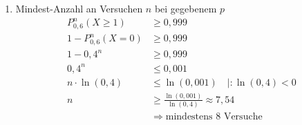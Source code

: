 \begin{itemize}
\begin{enumerate}
\begin{equation*}
\begin{split}
            1-p &\leq \sqrt[5]{0{,}1}\\
            p &\geq 1-\sqrt[5]{0{,}1} \approx 0{,}369
        \end{split}
    \end{equation*}
    \item Mindest-Anzahl an Versuchen $n$ bei gegebenem $p$
    \begin{equation*}
        \begin{split}
            P^n_{0{,}6}(X\geq 1) &\geq 0{,}999\\
            1-P^n_{0{,}6}(X=0)&\geq 0{,}999\\
            1-0{,}4^n &\geq 0{,}999\\
            0{,}4^n &\leq 0{,}001\\
            n\cdot\ln(0{,}4) &\leq \ln(0{,}001) \quad |:\ln(0{,}4)<0\\
           n &\geq \frac{\ln{(0{,}001)}}{\ln{(0{,}4)}} \approx 7{,}54\\
           &\Rightarrow \text{mindestens } 8 \text{ Versuche}
        \end{split}
    \end{equation*}
\end{enumerate}
\end{itemize}
